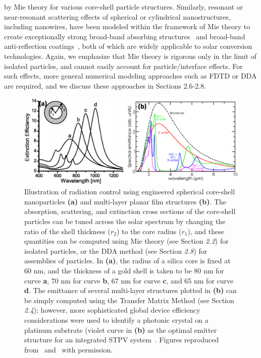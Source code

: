 \documentclass[review]{elsarticle}
\begin{document}
by Mie theory for various core-shell particle structures.  
Similarly, resonant or near-resonant scattering effects of spherical or cylindrical 
nanostructures, including nanowires, have been modeled within the framework of Mie theory to create exceptionally strong broad-band absorbing structures~\cite{FKA_OptExp_2014}
and broad-band anti-reflection coatings~\cite{SVP_NatComm_2012}, both of which are 
widely applicable to solar conversion technologies.  Again, we emphasize that Mie theory is rigorous only in the limit of isolated particles, 
and cannot easily account for particle/interface effects.
For such effects, more general numerical modeling approaches such as FDTD or DDA are required, and we discuss these approaches in Sections 2.6-2.8.

\begin{figure}[ht]
\begin{center}
        \includegraphics[width=\textwidth]{Halas_Celanovic}
        \caption{\label{Halas}  Illustration of radiation control using engineered spherical core-shell
nanoparticles {\bf (a)} and multi-layer planar film structures {\bf (b)}.
The absorption, scattering, and extinction cross sections of the core-shell particles can be tuned
across the solar spectrum by changing the ratio of the shell thickness ($r_2$) to the core radius ($r_1$), 
and these
quantities can be computed using Mie theory (see Section {\it 2.2}) for isolated particles, or the 
DDA method (see Section {\it 2.8}) for assemblies of particles.
In {\bf (a)}, the radius of a silica core is fixed at 60 nm, and the thickness of a gold shell is
taken to be 80 nm for curve {\bf a},
70 nm for curve {\bf b}, 67 nm for curve {\bf c}, and 65 nm for curve {\bf d}.
The emittance of several multi-layer structures plotted in {\bf (b)} can be simply computed
using the Transfer Matrix Method (see Section {\it 2.4}); however, 
more sophisticated global device
efficiency considerations were used to identify a photonic crystal on a platinum substrate 
(violet curve in {\bf (b)} as the optimal emitter structure for
an integrated STPV system~\cite{g4}.
Figures reproduced from~\cite{CH_APL_2006} and~\cite{g4} with permission.}
\end{center}
\end{figure}
\end{document}
